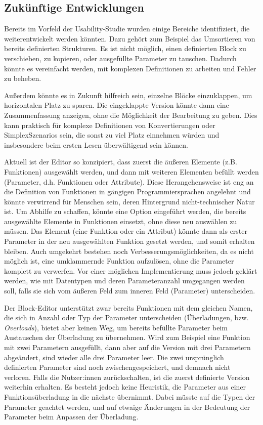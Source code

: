 \subsection{Zukünftige Entwicklungen}
\label{sec:future}

Bereits im Vorfeld der Usability-Studie wurden einige Bereiche identifiziert, die weiterentwickelt werden könnten. Dazu gehört zum Beispiel das Umsortieren von bereits definierten Strukturen. Es ist nicht möglich, einen definierten Block zu verschieben, zu kopieren, oder ausgefüllte Parameter zu tauschen. Dadurch könnte es vereinfacht werden, mit komplexen Definitionen zu arbeiten und Fehler zu beheben.

Außerdem könnte es in Zukunft hilfreich sein, einzelne Blöcke einzuklappen, um horizontalen Platz zu sparen. Die eingeklappte Version könnte dann eine Zusammenfassung anzeigen, ohne die Möglichkeit der Bearbeitung zu geben. Dies kann praktisch für komplexe Definitionen von Konvertierungen oder SimplexSzenarios sein, die sonst zu viel Platz einnehmen würden und insbesondere beim ersten Lesen überwältigend sein können.

\pskip
Aktuell ist der Editor so konzipiert, dass zuerst die äußeren Elemente (z.B. Funktionen) ausgewählt werden, und dann mit weiteren Elementen befüllt werden (Parameter, d.h. Funktionen oder Attribute). Diese Herangehensweise ist eng an die Definition von Funktionen in gängigen Programmiersprachen angelehnt und könnte verwirrend für Menschen sein, deren Hintergrund nicht-technischer Natur ist. Um Abhilfe zu schaffen, könnte eine Option eingeführt werden, die bereits ausgewählte Elemente in Funktionen einsetzt, ohne diese neu auswählen zu müssen. Das Element (eine Funktion oder ein Attribut) könnte dann als erster Parameter in der neu ausgewählten Funktion gesetzt werden, und somit erhalten bleiben. Auch umgekehrt bestehen noch Verbesserungsmöglichkeiten, da es nicht möglich ist, eine umklammernde Funktion aufzulösen, ohne die Parameter komplett zu verwerfen. Vor einer möglichen Implementierung muss jedoch geklärt werden, wie mit Datentypen und deren Parameteranzahl umgegangen werden soll, falls sie sich vom äußeren Feld zum inneren Feld (Parameter) unterscheiden.

\pskip
Der Block-Editor unterstützt zwar bereits Funktionen mit dem gleichen Namen, die sich in Anzahl oder Typ der Parameter unterscheiden (Überladungen, bzw. \textit{Overloads}), bietet aber keinen Weg, um bereits befüllte Parameter beim Austauschen der Überladung zu übernehmen. Wird zum Beispiel eine Funktion mit zwei Parametern ausgefüllt, dann aber auf die Version mit drei Parametern abgeändert, sind wieder alle drei Parameter leer. Die zwei ursprünglich definierten Parameter sind noch zwischengespeichert, und demnach nicht verloren. Falls die Nutzer:innen zurückschalten, ist die zuerst definierte Version weiterhin erhalten. Es besteht jedoch keine Heuristik, die Parameter aus einer Funktionsüberladung in die nächste übernimmt. Dabei müsste auf die Typen der Parameter geachtet werden, und auf etwaige Änderungen in der Bedeutung der Parameter beim Anpassen der Überladung.

